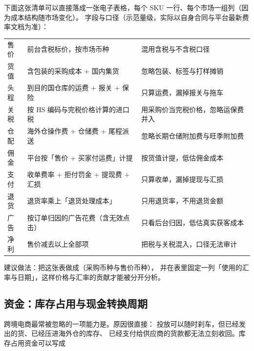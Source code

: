 \begin{toolbox}
下面这张清单可以直接落成一张电子表格，每个 SKU 一行、每个市场一组列（因为成本结构随市场变化）。
字段与口径（示范量级，实际以自身合同与平台最新费率文档为准）：
\begin{center}
\small
\begin{tabularx}{\linewidth}{L{2.6cm} L{4.0cm} Y}
\toprule
{} &  &  \\
\midrule
售价 & 前台含税标价，按市场币种 & 混用含税与不含税口径 \\
\addlinespace
货值 & 含包装的采购成本 + 国内集货 & 忽略包装、标签与打样摊销 \\
\addlinespace
头程 & 到目的国仓库的运费 + 报关 + 保险 & 只算运费，漏掉报关与拖车 \\
\addlinespace
关税 & 按 HS 编码与完税价格计算的进口税 & 用采购价当完税价格，忽略运保费并入 \\
\addlinespace
仓配 & 海外仓操作费 + 仓储费 + 尾程派送 & 忽略长期仓储附加费与旺季附加费 \\
\addlinespace
佣金 & 平台按「售价 + 买家付运费」计提 & 按货值计提，低估佣金成本 \\
\addlinespace
支付 & 收单费率 + 拒付罚金 + 提现费 + 汇损 & 只算收单，漏掉提现与汇损 \\
\addlinespace
退货 & 退货率乘上「退货处理成本」 & 只用退货率，不用退货金额 \\
\addlinespace
广告 & 按订单归因的广告花费（含无效点击） & 只看后台归因，低估真实获客成本 \\
\addlinespace
净利 & 售价减去以上全部项 & 把税与关税混入，口径无法审计 \\
\bottomrule
\end{tabularx}
\label{tab:cbec-unit-template}
\end{center}
建议做法：把这张表做成（采购币种与售价币种），
并在表里固定一列「使用的汇率与日期」，这样价格与汇率的贡献才能被分开分析。
\end{toolbox}

\subsection{资金：库存占用与现金转换周期}

跨境电商最常被忽略的一项能力是。原因很直接：
投放可以随时刹车，但已经发出的货、已经压进海外仓的库存、
已经支付给供应商的货款都无法立刻收回。库存占用资金可以写成

